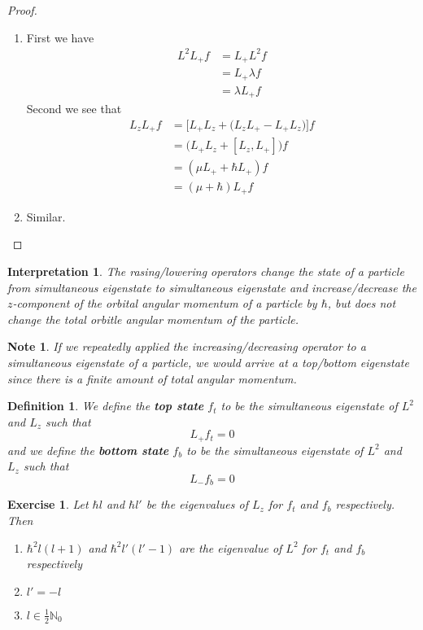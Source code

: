 \documentclass[12pt]{amsart}
\newtheorem{defn}[thm]{Definition}
\newtheorem{intp}[thm]{Interpretation}
\newtheorem{note}[thm]{Note}
\newtheorem{ex}[thm]{Exercise}
\newcommand{\lam}{\lambda}
\newcommand{\N}{\mathbb{N}}
\begin{document}
\begin{proof}\
\begin{enumerate}
\item  First we have
\begin{align*}
L^2L_+f 
&= L_+L^2 f\\
&= L_+ \lam f \\
&= \lam L_+ f
\end{align*}
Second we see that
\begin{align*}
L_zL_+f 
&= \bigg[ L_+L_z + \big(L_zL_+ - L_+L_z\big) \bigg]f \\
&= \big(L_+L_z + [L_z, L_+] \big)f \\
&= (\mu L_+ + \hbar L_+)f \\
&= (\mu + \hbar )L_+f  
\end{align*}
\item Similar.
\end{enumerate}
\end{proof}

\begin{intp}
The rasing/lowering operators change the state of a particle from simultaneous eigenstate to simultaneous eigenstate and increase/decrease the $z$-component of the orbital angular momentum of a particle by $\hbar$, but does not change the total orbitle angular momentum of the particle. 
\end{intp}

\begin{note}
If we repeatedly applied the increasing/decreasing operator to a simultaneous eigenstate of a particle, we would arrive at a top/bottom eigenstate since there is a finite amount of total angular momentum.
\end{note}

\begin{defn}
We define the \textbf{top state} $f_t$ to be the simultaneous eigenstate of $L^2$ and $L_z$ such that $$L_+f_t = 0$$ and we define the \textbf{bottom state} $f_b$ to be the simultaneous eigenstate of $L^2$ and $L_z$ such that $$L_-f_b = 0$$ 
\end{defn}

\begin{ex}
Let $\hbar l$ and $\hbar l'$ be the eigenvalues of $L_z$ for $f_t$ and $f_b$ respectively. Then 
\begin{enumerate}
\item $\hbar^2l(l+1)$ and $\hbar^2l'(l'-1)$ are the eigenvalue of $L^2$ for $f_t$ and $f_b$ respectively
\item $l'=-l$
\item $l \in \frac{1}{2}\N_0$
\end{enumerate}
\end{ex}
\end{document}
